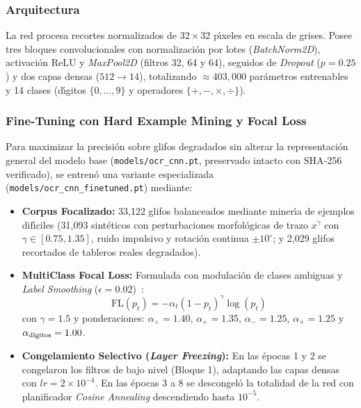 \documentclass[conference]{IEEEtran}
\begin{document}
\subsubsection{Arquitectura}
La red procesa recortes normalizados de $32 \times 32$ p\'{\i}xeles en escala de grises. Posee tres bloques convolucionales con normalizaci\'on por lotes (\textit{BatchNorm2D}), activaci\'on ReLU y \textit{MaxPool2D} (filtros 32, 64 y 64), seguidos de \textit{Dropout} ($p=0.25$) y dos capas densas ($512 \to 14$), totalizando $\approx 403{,}000$ par\'ametros entrenables y 14 clases (d\'{\i}gitos $\{0, \dots, 9\}$ y operadores $\{+, -, \times, \div\}$).

\subsubsection{Fine-Tuning con Hard Example Mining y Focal Loss}
Para maximizar la precisi\'on sobre glifos degradados sin alterar la representaci\'on general del modelo base (\texttt{models/ocr\_cnn.pt}, preservado intacto con SHA-256 verificado), se entren\'o una variante especializada (\texttt{models/ocr\_cnn\_finetuned.pt}) mediante:
\begin{itemize}
    \item \textbf{Corpus Focalizado:} 33{,}122 glifos balanceados mediante miner\'{\i}a de ejemplos dif\'{\i}ciles (31{,}093 sint\'eticos con perturbaciones morfol\'ogicas de trazo $x^\gamma$ con $\gamma \in [0.75, 1.35]$, ruido impulsivo y rotaci\'on continua $\pm 10^\circ$; y 2{,}029 glifos recortados de tableros reales degradados).
    \item \textbf{MultiClass Focal Loss:} Formulada con modulaci\'on de clases ambiguas y \textit{Label Smoothing} ($\epsilon = 0.02$)~\cite{lin2017focal}:
    \begin{equation}
        \text{FL}(p_t) = -\alpha_t (1 - p_t)^\gamma \log(p_t)
    \end{equation}
    con $\gamma = 1.5$ y ponderaciones: $\alpha_{\div} = 1.40$, $\alpha_{+} = 1.35$, $\alpha_{-} = 1.25$, $\alpha_{\times} = 1.25$ y $\alpha_{\text{d\'{\i}gitos}} = 1.00$.
    \item \textbf{Congelamiento Selectivo (\textit{Layer Freezing}):} En las \'epocas 1 y 2 se congelaron los filtros de bajo nivel (Bloque 1), adaptando las capas densas con $lr = 2 \times 10^{-4}$. En las \'epocas 3 a 8 se descongel\'o la totalidad de la red con planificador \textit{Cosine Annealing} descendiendo hasta $10^{-5}$.
\end{itemize}
\end{document}
